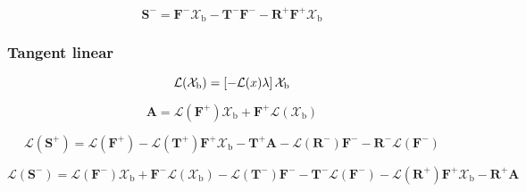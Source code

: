 \begin{equation}
\mathbf{S}^{-} = \mathbf{F}^{-}\mathcal{X}_{\mathrm{b}} - \mathbf{T}^{-}\mathbf{F}^{-} - \mathbf{R}^{+}\mathbf{F}^{+}\mathcal{X}_{\mathrm{b}}
\label{eq:solar_source-global_solar_source-forward-S_m}
\end{equation}


%
\subsubsection{Tangent linear}
\label{sec:solar_source-global_solar_source-tangent_linear}

\begin{equation}
\mathcal{L}(\mathcal{X}_{\mathrm{b}}) = \left[-\mathcal{L}(x) \lambda \right]\mathcal{X}_{\mathrm{b}}
\label{eq:solar_source-global_solar_source-tangent_linear-layer_trans_l}
\end{equation}

\begin{equation}
\mathbf{A} = \mathcal{L}(\mathbf{F}^{+})\mathcal{X}_{\mathrm{b}} + \mathbf{F}^{+}\mathcal{L}(\mathcal{X}_{\mathrm{b}})
\label{eq:solar_source-global_solar_source-tangent_linear-A}
\end{equation}

\begin{equation}
\mathcal{L}(\mathbf{S}^{+}) = \mathcal{L}(\mathbf{F}^{+}) - \mathcal{L}(\mathbf{T}^{+})\mathbf{F}^{+}\mathcal{X}_{\mathrm{b}} - \mathbf{T}^{+}\mathbf{A} - \mathcal{L}(\mathbf{R}^{-})\mathbf{F}^{-} - \mathbf{R}^{-}\mathcal{L}(\mathbf{F}^{-})
\label{eq:solar_source-global_solar_source-tangent_linear-V_p}
\end{equation}

\begin{equation}
\mathcal{L}(\mathbf{S}^{-}) = \mathcal{L}(\mathbf{F}^{-})\mathcal{X}_{\mathrm{b}} + \mathbf{F}^{-}\mathcal{L}(\mathcal{X}_{\mathrm{b}}) - \mathcal{L}(\mathbf{T}^{-})\mathbf{F}^{-} - \mathbf{T}^{-}\mathcal{L}(\mathbf{F}^{-}) - \mathcal{L}(\mathbf{R}^{+})\mathbf{F}^{+}\mathcal{X}_{\mathrm{b}} - \mathbf{R}^{+}\mathbf{A}
\label{eq:solar_source-global_solar_source-tangent_linear-V_m}
\end{equation}


%
